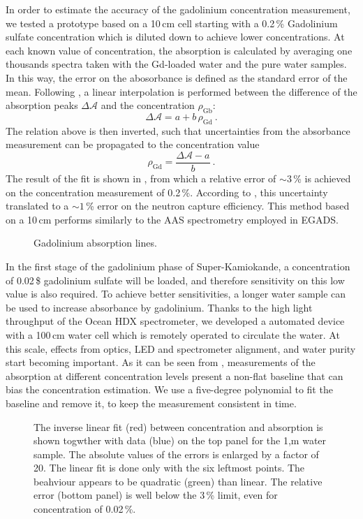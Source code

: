 In order to estimate the accuracy of the gadolinium concentration measurement, %
we tested a prototype based on a 10\,cm cell starting with a 0.2\,\% Gadolinium sulfate concentration %
which is diluted down to achieve lower concentrations.
At each known value of concentration, the absorption is calculated by averaging one thousands spectra %
taken with the Gd-loaded water and the pure water samples.
In this way, the error on the abosorbance is defined as the standard error of the mean.
Following , a linear interpolation is performed between the difference of the absorption peaks %
$\Delta \mathcal{A}$ and the concentration $\rho_\text{Gb}$: 
\begin{equation}
	\Delta \mathcal{A} = a + b\,\rho_\text{Gd}\ .
\end{equation}
The relation above is then inverted, such that uncertainties from the absorbance measurement %
can be propagated to the concentration value
\begin{equation}
	\rho_\text{Gd} = \frac{\Delta \mathcal{A} - a}{b}\ .
\end{equation}
The result of the fit is shown in , from which a relative error of $\sim3$\,\% %
is achieved on the concentration measurement of 0.2\,\%.
According to , this uncertainty translated to a $\sim1$\,\% error on the neutron capture efficiency.
This method based on a 10\,cm performs similarly to the AAS spectrometry employed in EGADS.

\begin{figure}
	\centering
	\resizebox{\linewidth}{!}{}
	\caption{Gadolinium absorption lines.}
	\label{fig:gad_fit}
\end{figure}

In the first stage of the gadolinium phase of Super-Kamiokande, a concentration of 0.02\,\$ gadolinium sulfate %
will be loaded, and therefore sensitivity on this low value is also required.
To achieve better sensitivities, a longer water sample can be used to increase absorbance by gadolinium.
Thanks to the high light throughput of the Ocean HDX spectrometer, we developed a automated device %
with a 100\,cm water cell which is remotely operated to circulate the water.
At this scale, effects from optics, LED and spectrometer alignment, and water purity start becoming important.
As it can be seen from , measurements of the absorption at different concentration levels %
present a non-flat baseline that can bias the concentration estimation.
We use a five-degree polynomial to fit the baseline and remove it, to keep the measurement consistent in time.


\begin{figure}
	\centering
	\resizebox{0.9\textwidth}{!}{}
	\caption{The inverse linear fit (red) between concentration and absorption %
		is shown togwther with data (blue) on the top panel for the 1,m water sample.
		The absolute values of the errors is enlarged by a factor of 20.
		The linear fit is done only with the six leftmost points.
		The beahviour appears to be quadratic (green) than linear.
		The relative error (bottom panel) is well below the 3\,\% limit, %
		even for concentration of 0.02\,\%.}
	\label{fig:gad_1m}
\end{figure}
